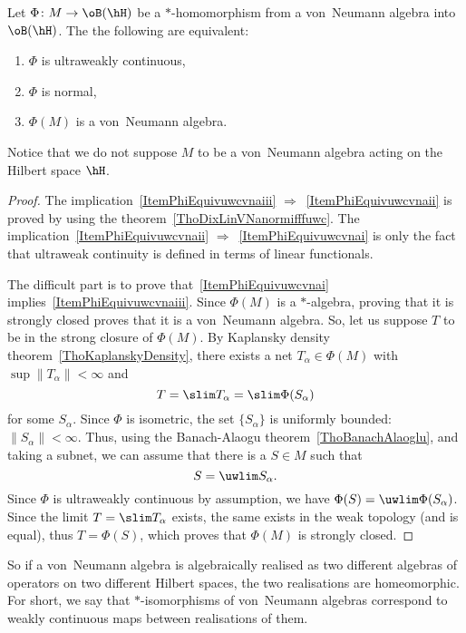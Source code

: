 \begin{theorem}				\label{ThoPhiEquivuwcvna}
Let $\Phi\colon M\to \oB(\hH)$ be a $*$-homomorphism from a von~Neumann algebra into $\oB(\hH)$. The the following are equivalent:
\begin{enumerate}
\item\label{ItemPhiEquivuwcvnai} $\Phi$ is ultraweakly continuous,
\item\label{ItemPhiEquivuwcvnaii}  $\Phi$ is normal,
\item\label{ItemPhiEquivuwcvnaiii}  $\Phi(M)$ is a von~Neumann algebra.
\end{enumerate}
\end{theorem}
Notice that we do not suppose $M$ to be a von~Neumann algebra acting on the Hilbert space $\hH$.

\begin{proof}
The implication~\ref{ItemPhiEquivuwcvnaiii} $\Rightarrow$~\ref{ItemPhiEquivuwcvnaii} is proved by using the theorem~\ref{ThoDixLinVNanormifffuwc}. The implication~\ref{ItemPhiEquivuwcvnaii} $\Rightarrow$~\ref{ItemPhiEquivuwcvnai} is only the fact that ultraweak continuity is defined in terms of linear functionals.

The difficult part is to prove that~\ref{ItemPhiEquivuwcvnai} implies~\ref{ItemPhiEquivuwcvnaiii}. Since $\Phi(M)$ is a $*$-algebra, proving that it is strongly closed proves that it is a von~Neumann algebra. So, let us suppose $T$ to be in the strong closure of $\Phi(M)$. By Kaplansky density theorem~\ref{ThoKaplanskyDensity}, there exists a net $T_{\alpha}\in\Phi(M)$ with $\sup\| T_{\alpha} \|<\infty$ and
\begin{equation}
	T=\slim T_{\alpha}=\slim \Phi(S_{\alpha})
\end{equation}
for some $S_{\alpha}$. Since $\Phi$ is isometric, the set $\{ S_{\alpha} \}$ is uniformly bounded: $\| S_{\alpha} \|<\infty$. Thus, using the Banach-Alaogu theorem~\ref{ThoBanachAlaoglu}, and taking a subnet, we can assume that there is a $S\in M$ such that
\begin{equation}
	S=\uwlim S_{\alpha}.
\end{equation}
Since $\Phi$ is ultraweakly continuous by assumption, we have $\Phi(S)=\uwlim\Phi(S_{\alpha})$. Since the limit $T=\slim T_{\alpha}$ exists, the same exists in the weak topology (and is equal), thus $T=\Phi(S)$, which proves that $\Phi(M)$ is strongly closed.
\end{proof}

So if a von~Neumann algebra is algebraically realised as two different algebras of operators on two different Hilbert spaces, the two realisations are homeomorphic. For short, we say that $*$-isomorphisms of von~Neumann algebras correspond to weakly continuous maps between realisations of them.

